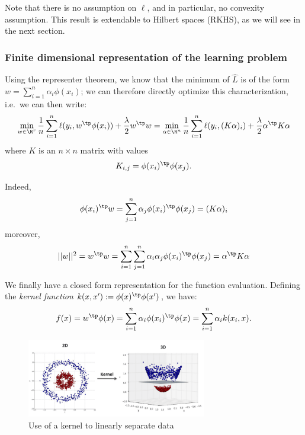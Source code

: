 \documentclass{../cs-classes/cs-classes}
\begin{document}
Note that there is no assumption on $\ell$, and in particular, no convexity assumption. This result is extendable to Hilbert spaces (RKHS), as we will see in the next section.

\subsubsection{Finite dimensional representation of the learning problem}
Using the representer theorem, we know that the minimum of $\hat{L}$ is of the form $w=\sum_{i=1}^n \alpha_i\phi(x_i)$; we can therefore directly optimize this characterization, i.e.~we can then write:
\begin{equation*}
    \min_{w\in\R^r} \frac{1}{n} \sum_{i=1}^n \ell(y_i, w^\tp\phi(x_i)) + \frac{\lambda}{2} w^\tp w = \min_{\alpha\in\R^n} \frac{1}{n}\sum_{i=1}^n \ell(y_i, (K\alpha)_i) + \frac{\lambda}{2}\alpha^\tp K\alpha
\end{equation*}
where $K$ is an $n\times n$ matrix with values
\begin{equation*}
    K_{i, j} = \phi(x_i)^\tp \phi(x_j).
\end{equation*}

Indeed,
\begin{equation*}
    \phi(x_i)^\tp w = \sum_{j=1}^n \alpha_j\phi(x_i)^\tp\phi(x_j) = (K\alpha)_i
\end{equation*}
moreover,
\begin{equation*}
    ||w||^2 = w^\tp w = \sum_{i=1}^n\sum_{j=1}^n \alpha_i\alpha_j\phi(x_i)^\tp\phi(x_j) = \alpha^\tp K\alpha
\end{equation*}

We finally have a closed form representation for the function evaluation. Defining the \emph{kernel function} $k(x, x'):=\phi(x)^\tp \phi(x')$, we have:
\begin{equation*}
    f(x) = w^\tp\phi(x) = \sum_{i=1}^n \alpha_i\phi(x_i)^\tp\phi(x) = \sum_{i=1}^n \alpha_i k(x_i, x).
\end{equation*}

\begin{figure}[H]
    \centering
    \includegraphics[width=0.7\textwidth]{images/kernel-trick.png}
    \caption{Use of a kernel to linearly separate data}
\end{figure}
\end{document}
